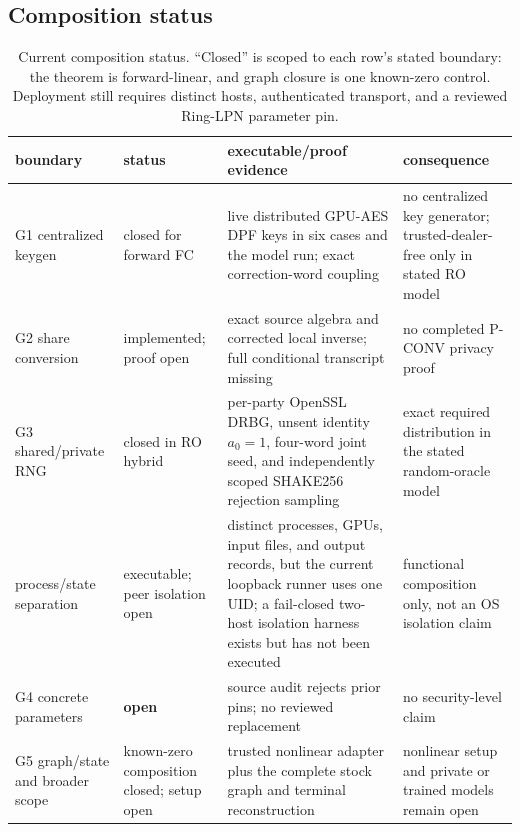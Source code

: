 \documentclass[11pt]{article}
\begin{document}
\subsection{Composition status}
\label{sec:design-composition}
\begin{table}[ht]
\centering
\small
\begin{tabular}{>{\raggedright\arraybackslash}p{2.6cm}>{\raggedright\arraybackslash}p{2.1cm}>{\raggedright\arraybackslash}p{5.3cm}>{\raggedright\arraybackslash}p{2.7cm}}
\toprule
boundary & status & executable/proof evidence & consequence\\
\midrule
G1 centralized keygen & closed for forward FC & live distributed GPU-AES DPF
keys in six cases and the model run; exact correction-word coupling &
no centralized key generator; trusted-dealer-free only in stated RO model\\
G2 share conversion & implemented; proof open & exact source algebra and
corrected local inverse; full conditional transcript missing & no completed
P-CONV privacy proof\\
G3 shared/private RNG & closed in RO hybrid & per-party OpenSSL DRBG, unsent
identity $a_0=1$, four-word joint seed, and independently scoped SHAKE256
rejection sampling & exact required distribution in the stated random-oracle
model\\
process/state separation & executable; peer isolation open & distinct
processes, GPUs, input files, and output records, but the current loopback
runner uses one UID; a fail-closed two-host isolation harness exists but has
not been executed & functional composition only, not an OS isolation claim\\
G4 concrete parameters & \textbf{open} & source audit rejects prior pins; no
reviewed replacement & no security-level claim\\
G5 graph/state and broader scope & known-zero composition closed; setup open &
trusted nonlinear adapter plus the complete stock graph and terminal
reconstruction & nonlinear setup and private or trained models remain open\\
\bottomrule
\end{tabular}
\caption{Current composition status. ``Closed'' is scoped to each row's stated
boundary: the theorem is forward-linear, and graph closure is one known-zero
control. Deployment still requires distinct hosts, authenticated transport,
and a reviewed Ring-LPN parameter pin.}
\label{tab:composition}
\end{table}
\end{document}
